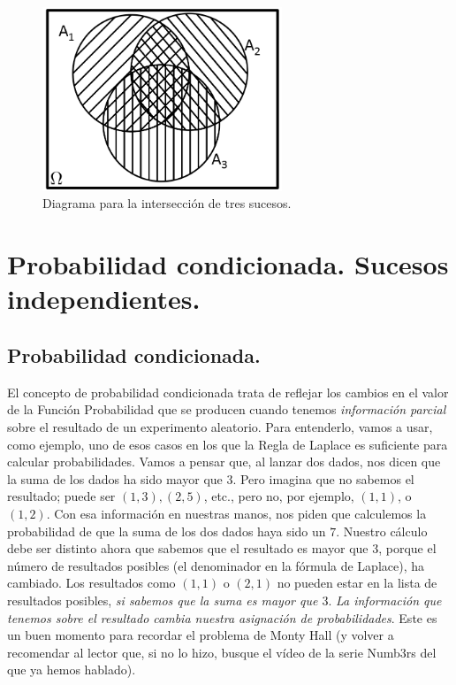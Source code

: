 \begin{figure}[h!]
\begin{center}
    \includegraphics[height=5.5cm]{../fig/Cap03-DiagramaVennUnioTresSucesos.png}
	\caption{Diagrama para la intersección de tres sucesos.}
    \label{Cap03:fig:DiagramaVennUnioTresSucesos}
\end{center}
\end{figure}




\section{Probabilidad condicionada. Sucesos independientes.}
\label{cap03:sec:ProbabilidadCondicionadaIndependencia}


\subsection{Probabilidad condicionada.}
\label{cap03:subsec:ProbabilidadCondicionada}

El concepto de probabilidad condicionada trata de reflejar los cambios en el
valor de la Función Probabilidad que se producen cuando tenemos {\em
información parcial} sobre el resultado de un experimento aleatorio. Para
entenderlo, vamos a usar, como ejemplo, uno de esos casos en los que la Regla
de Laplace es suficiente para calcular probabilidades. Vamos a pensar que, al
lanzar dos dados, nos dicen que la suma de los dados ha sido mayor que 3.
Pero imagina que no sabemos el resultado; puede ser $(1,3), (2,5)$, etc.,
pero no, por ejemplo, $(1,1)$, o $(1,2)$. Con esa información en nuestras
manos, nos piden que calculemos la probabilidad de que la suma de los dos
dados haya sido un $7$. Nuestro cálculo debe ser distinto ahora que sabemos
que el resultado es mayor que 3, porque el número de resultados posibles (el
denominador en la fórmula de Laplace), ha cambiado. Los resultados como
$(1,1)$ o $(2,1)$ no pueden estar en la lista de resultados posibles, {\em si
sabemos que la suma es mayor que $3$}.  {\sf\em La información que tenemos
sobre el resultado cambia nuestra asignación de probabilidades}. Este es un
buen momento para recordar el problema de Monty Hall (y volver a recomendar
al lector que, si no lo hizo, busque el vídeo de la serie Numb3rs del que ya
hemos hablado).

